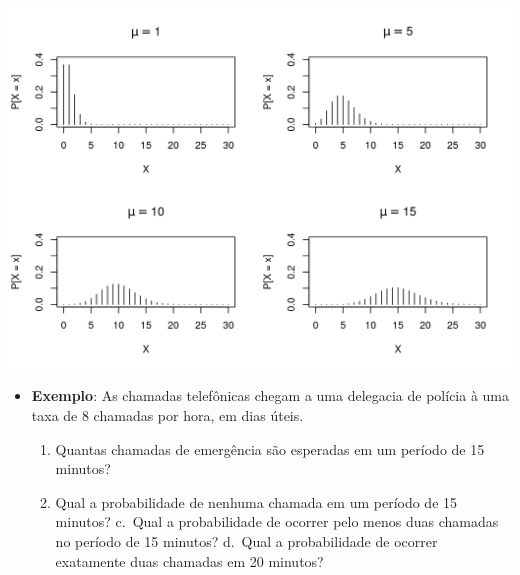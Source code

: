 \documentclass[
  10pt,
  a4paper]{book}
\providecommand{\tightlist}{%
  \setlength{\itemsep}{0pt}\setlength{\parskip}{0pt}}
\begin{document}
\begin{center}\includegraphics{figures/unnamed-chunk-353-1} \end{center}

\begin{itemize}
\tightlist
\item
  \textbf{Exemplo}: As chamadas telefônicas chegam a uma delegacia de
  polícia à uma taxa de 8 chamadas por hora, em dias úteis.

  \begin{enumerate}
  \def\labelenumi{\alph{enumi}.}
  \tightlist
  \item
    Quantas chamadas de emergência são esperadas em um período de 15 minutos?
  \item
    Qual a probabilidade de nenhuma chamada em um período de 15 minutos?
    c.~Qual a probabilidade de ocorrer pelo menos duas chamadas no período de 15 minutos?
    d.~Qual a probabilidade de ocorrer exatamente duas chamadas em 20 minutos?
  \end{enumerate}
\end{itemize}
\end{document}
